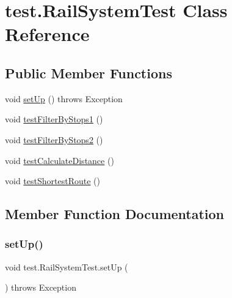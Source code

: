 \hypertarget{classtest_1_1_rail_system_test}{}\section{test.\+Rail\+System\+Test Class Reference}
\label{classtest_1_1_rail_system_test}
\subsection*{Public Member Functions}
\begin{DoxyCompactItemize}
\item 
void \hyperlink{classtest_1_1_rail_system_test_ab85936c259158b670fc1926bbe54fd2d}{set\+Up} ()  throws Exception 
\item 
void \hyperlink{classtest_1_1_rail_system_test_a788f13f636cb5c25db513fff9fe8668b}{test\+Filter\+By\+Stops1} ()
\item 
void \hyperlink{classtest_1_1_rail_system_test_a2a1e9411ccf36a39296c00a201f17f37}{test\+Filter\+By\+Stops2} ()
\item 
void \hyperlink{classtest_1_1_rail_system_test_a5d1486af4e81c48f82549f1a57eff766}{test\+Calculate\+Distance} ()
\item 
void \hyperlink{classtest_1_1_rail_system_test_a01b95869ac2414fa487a6540436d7563}{test\+Shortest\+Route} ()
\end{DoxyCompactItemize}


\subsection{Member Function Documentation}
\mbox{\label{classtest_1_1_rail_system_test_ab85936c259158b670fc1926bbe54fd2d}} 
\subsubsection{\texorpdfstring{set\+Up()}{setUp()}}
{\footnotesize\ttfamily void test.\+Rail\+System\+Test.\+set\+Up (\begin{DoxyParamCaption}{ }\end{DoxyParamCaption}) throws Exception}

